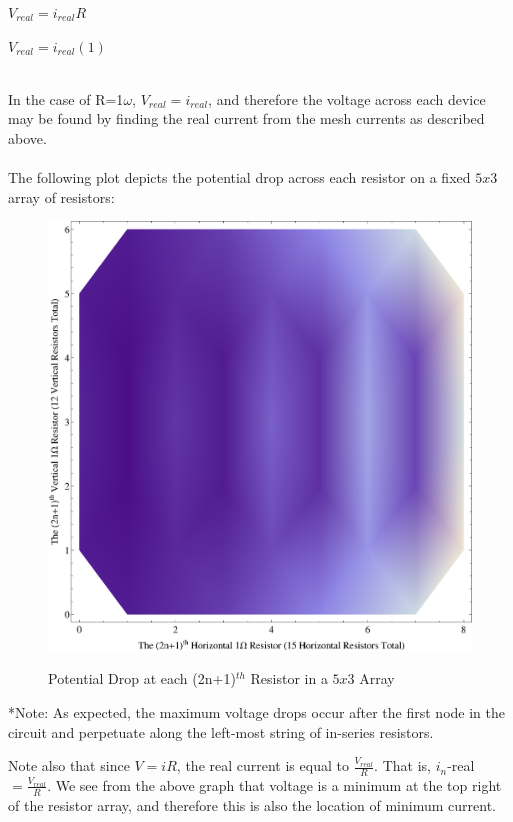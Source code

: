 \documentclass{report}
\begin{document}
\begin{enumerate}
\begin{center}
$\displaystyle V_{real} = i_{real}R$
\end{center}
\begin{center}
$\displaystyle V_{real} = i_{real}(1)$
\end{center}
\\In the case of R=1$\omega$, $V_{real} = i_{real}$, and therefore the voltage across each device may be found by finding the real current from the mesh currents as described above.
\\
\\The following plot depicts the potential drop across each resistor on a fixed $5x3$ array of resistors:
\begin{figure}[H]
\centering \caption{Potential Drop at each (2n+1)$^{th}$ Resistor in a $5x3$  Array}
\includegraphics[scale=.81]{potdrop.eps}
\label{potdrop}
\end{figure}
*Note: As expected, the maximum voltage drops occur after the first node in the circuit and perpetuate along the left-most string of in-series resistors. 

Note also that since $V=iR$, the real current is equal to $\frac{V_{real}}{R}$. That is, $i_n$-real $=\frac{V_{real}}{R}$. We see from the above graph that voltage is a minimum at the top right of the resistor array, and therefore this is also the location of minimum current.


























\end{enumerate}
\end{document}
